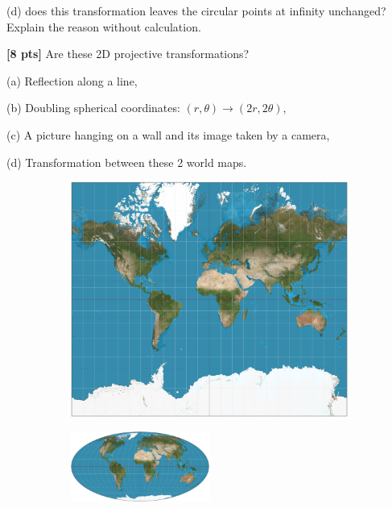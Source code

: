 \documentclass[11pt,addpoints,answers]{exam}
\numberwithin{equation}{section} %
\numberwithin{figure}{section} %
\numberwithin{table}{section} %
\begin{document}
\begin{questions}
(d) does this transformation leaves the circular points at infinity unchanged? Explain the reason without calculation.

\begin{tcolorbox}[fit,height=5cm, width=\textwidth, blank, borderline={0.5pt}{-2pt},halign=left, valign=center, nobeforeafter]


\end{tcolorbox}

\question \textbf{[8 pts]} Are these 2D projective transformations?

(a) Reflection along a line,

(b) Doubling spherical coordinates: $(r,\theta) \rightarrow (2r, 2\theta)$,

(c) A picture hanging on a wall and its image taken by a camera,

(d) Transformation between these 2 world maps.
\begin{figure}[h!]
    \centering
    \begin{subfigure}{0.48\linewidth}
        \centering
        {\includegraphics[width=0.33\linewidth]{figures/Mercator_projection_SW.jpg}}
    \end{subfigure}
    \begin{subfigure}{0.48\linewidth}
        \centering
        {\includegraphics[width=0.5\textwidth]{figures/Mollweide_projection_SW.jpg}}
    \end{subfigure}
\end{figure}

\begin{tcolorbox}[fit,height=5cm, width=\textwidth, blank, borderline={0.5pt}{-2pt},halign=left, valign=center, nobeforeafter]


\end{tcolorbox}


\end{questions}
\end{document}
